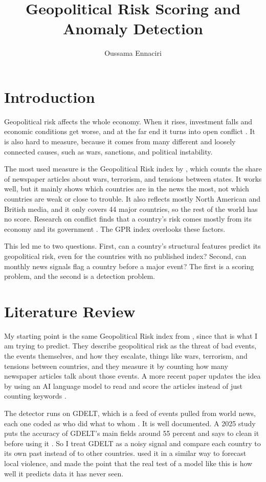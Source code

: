 \documentclass[stu,12pt,floatsintext]{apa7}
\title{Geopolitical Risk Scoring and Anomaly Detection}
\author{Oussama Ennaciri}
\affiliation{Anderson College of Business and Computing, Regis University}
\begin{document}
\maketitle

\section{Introduction}
Geopolitical risk affects the whole economy. When it rises, investment falls and economic conditions get worse, and at the far end it turns into open conflict \cite{caldara2022}. It is also hard to measure, because it comes from many different and loosely connected causes, such as wars, sanctions, and political instability.

The most used measure is the Geopolitical Risk index by , which counts the share of newspaper articles about wars, terrorism, and tensions between states. It works well, but it mainly shows which countries are in the news the most, not which countries are weak or close to trouble. It also reflects mostly North American and British media, and it only covers 44 major countries, so the rest of the world has no score. Research on conflict finds that a country's risk comes mostly from its economy and its government \cite{obukhov2023}. The GPR index overlooks these factors.

This led me to two questions. First, can a country's structural features predict its geopolitical risk, even for the countries with no published index? Second, can monthly news signals flag a country before a major event? The first is a scoring problem, and the second is a detection problem.

\section{Literature Review}
My starting point is the same Geopolitical Risk index from , since that is what I am trying to predict. They describe geopolitical risk as the threat of bad events, the events themselves, and how they escalate, things like wars, terrorism, and tensions between countries, and they measure it by counting how many newspaper articles talk about those events. A more recent paper updates the idea by using an AI language model to read and score the articles instead of just counting keywords \cite{iacoviello2026}.

The detector runs on GDELT, which is a feed of events pulled from world news, each one coded as who did what to whom \cite{leetaru2013}. It is well documented. A 2025 study puts the accuracy of GDELT's main fields around 55 percent and says to clean it before using it \cite{hong2025}. So I treat GDELT as a noisy signal and compare each country to its own past instead of to other countries.  used it in a similar way to forecast local violence, and made the point that the real test of a model like this is how well it predicts data it has never seen.
\end{document}
